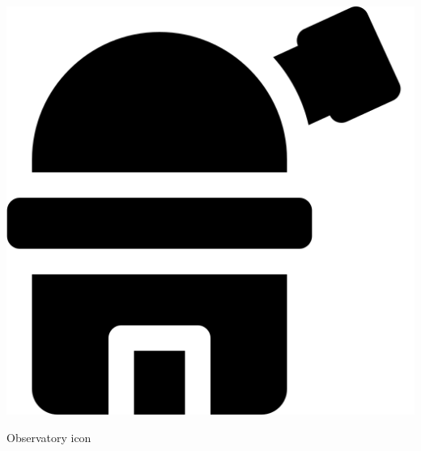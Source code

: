 \documentclass{article}
\begin{document}
\noindent
\begin{minipage}[t]{0.1\textwidth}
    \includegraphics[width=\linewidth]{Image/observatory.png}
\end{minipage}
\hfill
\begin{minipage}[t]{0.85\textwidth}
    Observatory icon \cite{flaticon_observatory_icon}
\end{minipage}

\newpage



\end{document}
